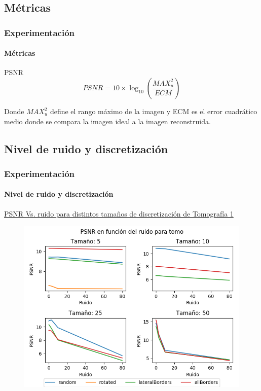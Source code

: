 \documentclass{beamer}
\begin{document}
\subsection{Métricas}

\begin{frame}
\frametitle{Experimentación}
\framesubtitle{Métricas}
\begin{block}{PSNR}
  \begin{equation*}
    PSNR = 10 \times \log_{10}(\frac{MAX^2_{u}}{ECM})
 \end{equation*}
 
 Donde $MAX^2_{u}$ define el rango máximo de la imagen y ECM es el error cuadrático medio donde se compara la imagen ideal a la imagen reconstruida.
\end{block}
\end{frame}

\subsection{Nivel de ruido y discretización}

\begin{frame}
\frametitle{Experimentación}
\framesubtitle{Nivel de ruido y discretización}
\underline{PSNR Vs. ruido para distintos tamaños de discretización de Tomografía 1}
\begin{figure}[H]
  \centering
  \includegraphics[height=0.75\textheight]{../graficos/noise/tomo/noise_graph.png}
\end{figure}
\end{frame}
\end{document}
